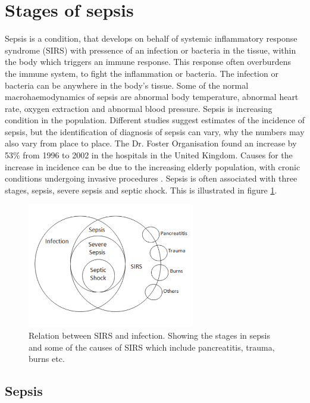 \section{Stages of sepsis}

Sepsis is a condition, that develops on behalf of systemic inflammatory response syndrome (SIRS) with pressence of an infection or bacteria in the tissue, within the body which triggers an immune response. This response often overburdens the immune system, to fight the inflammation or bacteria. The infection or bacteria can be anywhere in the body’s tissue. Some of the normal macrohaemodynamics of sepsis are abnormal body temperature, abnormal heart rate, oxygen extraction and abnormal blood pressure.\cite{plunta2010,kanta2014} Sepsis is increasing condition in the population. Different studies suggest estimates of the incidence of sepsis, but the identification of diagnosis of sepsis can vary, why the numbers may also vary from place to place.\cite{baudouin2008,kanta2014} The Dr. Foster Organisation found an increase by 53\% from 1996 to 2002 in the hospitals in the United Kingdom. Causes for the increase in incidence can be due to the increasing elderly population, with cronic conditions undergoing invasive procedures \cite{baudouin2008}.
Sepsis is often associated with three stages, sepsis, severe sepsis and septic shock. This is illustrated in figure \ref{fig:Sepsis_stages}.

\begin{figure}[H]
	\centering	\includegraphics[width=0.65\textwidth]{figures/Sepsis_stages}
	\caption{Relation between SIRS and infection. Showing the stages in sepsis and some of the causes of SIRS which include pancreatitis, trauma, burns etc.\cite{kanta2014}}
	\label{fig:Sepsis_stages}
\end{figure} \vspace{-.3cm}

\subsection{Sepsis}

